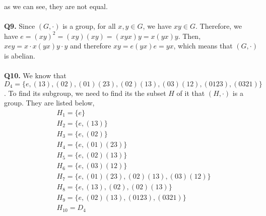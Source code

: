 \documentclass{article}[12pt]
\begin{document}
as we can see, they are not equal.\\ \\
\noindent \textbf{Q9.}
Since $(G, \cdot)$ is a group, for all $x,y\in G$, we have $xy\in G$. Therefore, we have $e=(xy)^2=(xy)(xy)=(xyx) y=x(yx)y$. Then, 
$
xey=x\cdot x(yx)y\cdot y$ and therefore $
xy=e(yx)e=yx
$, which means that $(G, \cdot)$ is abelian. 
\\ \\
\noindent \textbf{Q10.}
We know that $D_4=\{e,(13),(02),(01)(23),(02)(13),(03)(12),(0123),(0321)\}$. To find its subgroup, we need to find its the subset $H$ of it that $(H,\cdot)$ is a group. They are listed below,
\begin{align*}
&H_1=\{e\}\\
&H_2=\{e,(13)\}\\
&H_3=\{e,(02)\}\\
&H_4=\{e,(01)(23)\}\\
&H_5=\{e,(02)(13)\}\\
&H_6=\{e,(03)(12)\}\\
&H_7=\{e,(01)(23),(02)(13),(03)(12)\}\\
&H_8=\{e,(13),(02),(02)(13)\}\\
&H_9=\{e,(02)(13),(0123),(0321)\}\\
&H_{10}=D_4\\
\end{align*}







\end{document}
